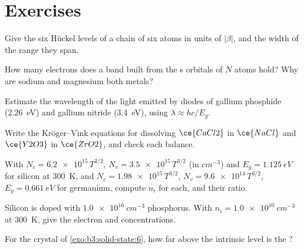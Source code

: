 \section{Exercises}

\begin{exercise}[$\star$]\label{exo:b3:solid-state:1}
Give the six Hückel levels of a chain of six atoms in units of $|\beta|$, and the
width of the range they span.
\end{exercise}

\begin{exercise}[$\star$]\label{exo:b3:solid-state:2}
How many electrons does a band built from the s orbitals of $N$ atoms hold? Why
are sodium and magnesium both metals?
\end{exercise}

\begin{exercise}[$\star$]\label{exo:b3:solid-state:3}
Estimate the wavelength of the light emitted by diodes of gallium phosphide
(\qty{2.26}{eV}) and gallium nitride (\qty{3.4}{eV}), using $\lambda \approx hc/E_g$.
\end{exercise}

\begin{exercise}[$\star$]\label{exo:b3:solid-state:4}
Write the Kröger--Vink equations for dissolving $\ce{CaCl2}$ in $\ce{NaCl}$ and $\ce{Y2O3}$ in $\ce{ZrO2}$, and
check each balance.
\end{exercise}

\begin{exercise}[$\star\star$]\label{exo:b3:solid-state:5}
With $N_c = \num{6.2e15}\,T^{3/2}$, $N_v = \num{3.5e15}\,T^{3/2}$ (in $\unit{cm^{-3}}$) and $E_g = \qty{1.125}{eV}$ for silicon at \qty{300}{K},
and $N_c = \num{1.98e15}\,T^{3/2}$, $N_v = \num{9.6e14}\,T^{3/2}$, $E_g = \qty{0.661}{eV}$ for germanium, compute $n_i$ for each, and their
ratio.
\end{exercise}

\begin{exercise}[$\star\star$]\label{exo:b3:solid-state:6}
Silicon is doped with $\qty{1.0e16}{cm^{-3}}$ phosphorus. With $n_i = \qty{1.0e10}{cm^{-3}}$ at \qty{300}{K}, give the
electron and  concentrations.
\end{exercise}

\begin{exercise}[$\star\star$]\label{exo:b3:solid-state:7}
For the crystal of \cref{exo:b3:solid-state:6}, how far above the intrinsic level is
the ?
\end{exercise}

